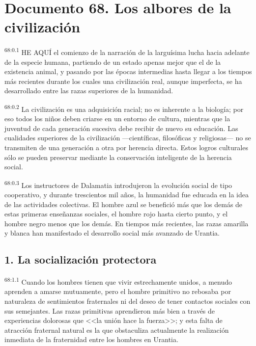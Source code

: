 \chapter{Documento 68. Los albores de la civilización}
\par
\textsuperscript{68:0.1} HE AQUÍ el comienzo de la narración de la larguísima lucha hacia adelante de la especie humana, partiendo de un estado apenas mejor que el de la existencia animal, y pasando por las épocas intermedias hasta llegar a los tiempos más recientes durante los cuales una civilización real, aunque imperfecta, se ha desarrollado entre las razas superiores de la humanidad.

\par
\textsuperscript{68:0.2} La civilización es una adquisición racial; no es inherente a la biología; por eso todos los niños deben criarse en un entorno de cultura, mientras que la juventud de cada generación sucesiva debe recibir de nuevo su educación. Las cualidades superiores de la civilización ---científicas, filosóficas y religiosas--- no se transmiten de una generación a otra por herencia directa. Estos logros culturales sólo se pueden preservar mediante la conservación inteligente de la herencia social.

\par
\textsuperscript{68:0.3} Los instructores de Dalamatia introdujeron la evolución social de tipo cooperativo, y durante trescientos mil años, la humanidad fue educada en la idea de las actividades colectivas. El hombre azul se benefició más que los demás de estas primeras enseñanzas sociales, el hombre rojo hasta cierto punto, y el hombre negro menos que los demás. En tiempos más recientes, las razas amarilla y blanca han manifestado el desarrollo social más avanzado de Urantia.

\section*{1. La socialización protectora}
\par
\textsuperscript{68:1.1} Cuando los hombres tienen que vivir estrechamente unidos, a menudo aprenden a amarse mutuamente, pero el hombre primitivo no rebosaba por naturaleza de sentimientos fraternales ni del deseo de tener contactos sociales con sus semejantes. Las razas primitivas aprendieron más bien a través de experiencias dolorosas que <<la unión hace la fuerza>>; y esta falta de atracción fraternal natural es la que obstaculiza actualmente la realización inmediata de la fraternidad entre los hombres en Urantia.

